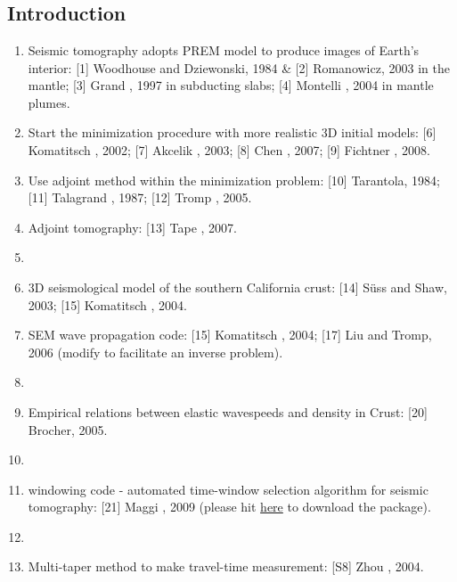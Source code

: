 \renewcommand{\pmk}{Tape\_2009\_S\_Adjoint at SCC}
\renewcommand{\prf}{FWI/\pmk.pdf}
\renewcommand{\pti}{Adjoint tomography of the southern California crust}
\renewcommand{\pay}{Carl Tape, Qinya Liu, and Alessia Maggi \etal, 2009}
\renewcommand{\pjo}{Science}
\renewcommand{\pda}{2016/11/27 Sun.}
\section{\pinfo}
\subsection{Introduction}
\begin{enumerate}[\hspace{10mm}*]
  \item Seismic tomography adopts PREM model to produce images of Earth's interior: [1] Woodhouse and Dziewonski, 1984 \& [2] Romanowicz, 2003 in the mantle; [3] Grand \etal, 1997 in subducting slabs; [4] Montelli \etal, 2004 in mantle plumes.
	\item Start the minimization procedure with more realistic 3D initial models: [6] Komatitsch \etal, 2002; [7] Akcelik \etal, 2003; [8] Chen \etal, 2007; [9] Fichtner \etal, 2008.
	\item Use adjoint method within the minimization problem: [10] Tarantola, 1984; [11] Talagrand \etal, 1987; [12] Tromp \etal, 2005.
	\item Adjoint tomography: [13] Tape \etal, 2007.
	\item \sline
	\item 3D seismological model of the southern California crust: [14] S\"{u}ss and Shaw, 2003; [15] Komatitsch \etal, 2004.
	\item SEM wave propagation code: [15] Komatitsch \etal, 2004; [17] Liu and Tromp, 2006 (modify to facilitate an inverse problem).
	\item \sline
	\item Empirical relations between elastic wavespeeds and density in Crust: [20] Brocher, 2005.
	\item \sline
    \item {} windowing code - automated time-window selection algorithm for seismic tomography: [21] Maggi \etal, 2009 (please hit \href{http://geodynamics.org/cig/software/flexwin/}{here} to download the package).
	\item \sline
    \item Multi-taper method to make travel-time measurement: [S8] Zhou \etal, 2004.

\end{enumerate}

